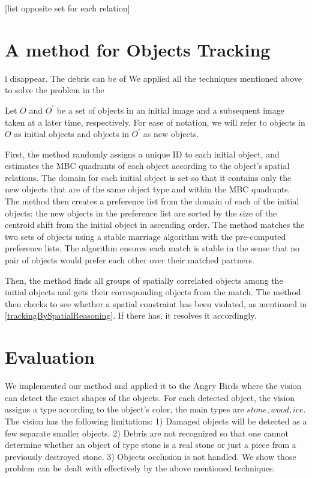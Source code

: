 \documentclass[letterpaper]{article}
\begin{document}
 [list opposite set for each relation]


\section{A method for Objects Tracking}l disappear. The debris can be of 
We applied all the techniques mentioned above to solve the problem in the 

Let $O$ and $O^{\prime}$ be a set of objects in an initial image and a subsequent image taken at a later time, respectively. For ease of notation, we will refer to objects in $O$ as initial objects and objects in $O^{\prime}$ as new objects.

First, the method randomly assigns a unique ID to each initial object, and estimates the MBC quadrants of each object according to the object's spatial relations. The domain for each initial object is set so that it contains only the new objects that are of the same object type and within the MBC quadrants. The method then creates a preference list from the domain of each of the initial objects: the new objects in the preference list are sorted by the size of the centroid shift from the initial object in ascending order. The method matches the two sets of objects using a stable marriage algorithm with the pre-computed preference lists. The algorithm ensures each match is stable in the sense that no pair of objects would prefer each other over their matched partners. 

Then, the method finds all groups of spatially correlated objects among the initial objects and gets their corresponding objects from the match. The method then checks to see whether a spatial constraint has been violated, as mentioned in \ref{trackingBySpatialReasoning}. If there has, it resolves it accordingly.


\section{Evaluation}
 We implemented our method and applied it to the Angry Birds where the vision can detect the exact shapes of the objects\cite{}. For each detected object, the vision assigns a type according to the object's color, the main types are $stone, wood, ice$. The vision has the following limitations: 1) Damaged objects will be detected as a few separate smaller objects. 2) Debris are not recognized so that one cannot determine whether an object of type stone is a real stone or just a piece from a previously destroyed stone. 3) Objects occlusion is not handled.  We show those problem can be dealt with effectively by the above mentioned techniques. 
\end{document}
